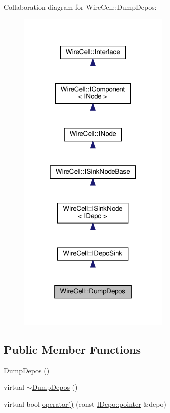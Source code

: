 Collaboration diagram for Wire\+Cell\+:\+:Dump\+Depos\+:
\nopagebreak
\begin{figure}[H]
\begin{center}
\leavevmode
\includegraphics[width=208pt]{class_wire_cell_1_1_dump_depos__coll__graph}
\end{center}
\end{figure}
\subsection*{Public Member Functions}
\begin{DoxyCompactItemize}
\item 
\hyperlink{class_wire_cell_1_1_dump_depos_a973919adfa8658af63f4747681fa57b8}{Dump\+Depos} ()
\item 
virtual \hyperlink{class_wire_cell_1_1_dump_depos_a02211aa77bc3ff53eb5d4c2e897732cf}{$\sim$\+Dump\+Depos} ()
\item 
virtual bool \hyperlink{class_wire_cell_1_1_dump_depos_a7e95cd8fef954d898fac763ba7e40b14}{operator()} (const \hyperlink{class_wire_cell_1_1_i_data_aff870b3ae8333cf9265941eef62498bc}{I\+Depo\+::pointer} \&depo)
\end{DoxyCompactItemize}
